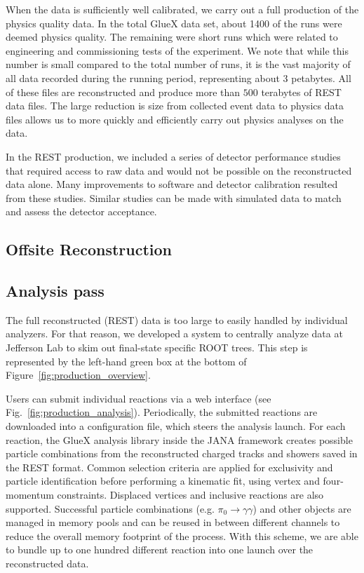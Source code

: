 When the data is sufficiently well calibrated, we carry out a full production of the physics quality data. In the total GlueX data set, about 1400 of the runs were deemed physics quality. The remaining were short runs which were related to engineering and commissioning tests of the experiment. We note that while this number is small compared to the total number of runs, it is the vast majority of all data recorded during the running period, representing about 3 petabytes. All of these files are reconstructed and produce more than $500$ terabytes of REST data files. The large reduction is size from collected event data to physics data files allows us to  more quickly and efficiently carry out physics analyses on the data.

In the REST production, we included a series of detector performance studies that required access to raw data and would not be possible on the reconstructed data alone. Many improvements to software and detector calibration resulted from these studies. Similar studies can be made with simulated data to match and assess the detector acceptance.

\subsection{Offsite Reconstruction}
\label{sec:recoffsite}

\subsection{Analysis pass \label{sec:recanalysis}}

The full reconstructed (REST) data is too large to easily handled by individual analyzers. For that reason, we developed a system to centrally analyze data at Jefferson Lab to skim out final-state specific ROOT trees. This step is represented by the left-hand green box at the bottom of Figure~\ref{fig:production_overview}.

Users can submit individual reactions via a web interface (see Fig.~\ref{fig:production_analysis}). Periodically, the submitted reactions are downloaded into a configuration file, which steers the analysis launch. For each reaction, the GlueX analysis library inside the JANA framework creates possible particle combinations from the reconstructed charged tracks and showers saved in the REST format. Common selection criteria are applied for exclusivity and particle identification before performing a kinematic fit, using vertex and four-momentum constraints. Displaced vertices and inclusive reactions are also supported. Successful particle combinations (e.g. $\pi_0 \rightarrow \gamma\gamma$) and other objects are managed in memory pools and can be reused in between different channels to reduce the overall memory footprint of the process. With this scheme, we are able to bundle up to one hundred different reaction into one launch over the reconstructed data.

